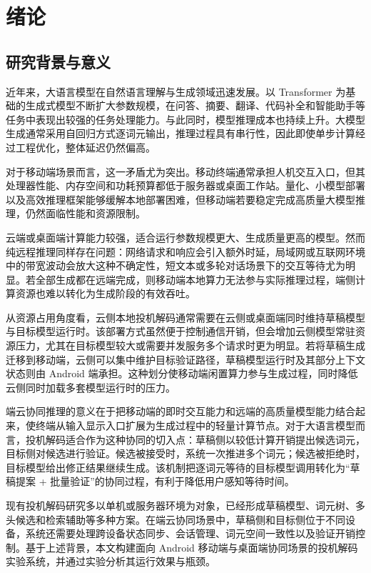 \section{绪论}

\subsection{研究背景与意义}

近年来，大语言模型在自然语言理解与生成领域迅速发展。以 Transformer 为基础的生成式模型不断扩大参数规模，在问答、摘要、翻译、代码补全和智能助手等任务中表现出较强的任务处理能力\cite{vaswani2017attention,touvron2023llama2}。与此同时，模型推理成本也持续上升。大模型生成通常采用自回归方式逐词元输出，推理过程具有串行性，因此即使单步计算经过工程优化，整体延迟仍然偏高\cite{leviathan2023speculative,kwon2023pagedattention}。

对于移动端场景而言，这一矛盾尤为突出。移动终端通常承担人机交互入口，但其处理器性能、内存空间和功耗预算都低于服务器或桌面工作站。量化、小模型部署以及高效推理框架能够缓解本地部署困难\cite{ggerganov2025llamacpp,frantar2022gptq,alizadeh2023llmflash}，但移动端若要稳定完成高质量大模型推理，仍然面临性能和资源限制。

云端或桌面端计算能力较强，适合运行参数规模更大、生成质量更高的模型。然而纯远程推理同样存在问题：网络请求和响应会引入额外时延，局域网或互联网环境中的带宽波动会放大这种不确定性，短文本或多轮对话场景下的交互等待尤为明显。若全部生成都在远端完成，则移动端本地算力无法参与实际推理过程，端侧计算资源也难以转化为生成阶段的有效吞吐。

从资源占用角度看，云侧本地投机解码通常需要在云侧或桌面端同时维持草稿模型与目标模型运行时。该部署方式虽然便于控制通信开销，但会增加云侧模型常驻资源压力，尤其在目标模型较大或需要并发服务多个请求时更为明显。若将草稿生成迁移到移动端，云侧可以集中维护目标验证路径，草稿模型运行时及其部分上下文状态则由 Android 端承担。这种划分使移动端闲置算力参与生成过程，同时降低云侧同时加载多套模型运行时的压力。

端云协同推理的意义在于把移动端的即时交互能力和远端的高质量模型能力结合起来，使终端从输入显示入口扩展为生成过程中的轻量计算节点。对于大语言模型而言，投机解码适合作为这种协同的切入点\cite{leviathan2023speculative,chen2023speculative,miao2023specinfer,li2024eagle}：草稿侧以较低计算开销提出候选词元，目标侧对候选进行验证。候选被接受时，系统一次推进多个词元；候选被拒绝时，目标模型给出修正结果继续生成。该机制把逐词元等待的目标模型调用转化为“草稿提案 + 批量验证”的协同过程，有利于降低用户感知等待时间。

现有投机解码研究多以单机或服务器环境为对象，已经形成草稿模型、词元树、多头候选和检索辅助等多种方案\cite{leviathan2023speculative,miao2023specinfer,cai2024medusa,he2023rest}。在端云协同场景中，草稿侧和目标侧位于不同设备，系统还需要处理跨设备状态同步、会话管理、词元空间一致性以及验证开销控制。基于上述背景，本文构建面向 Android 移动端与桌面端协同场景的投机解码实验系统，并通过实验分析其运行效果与瓶颈。

